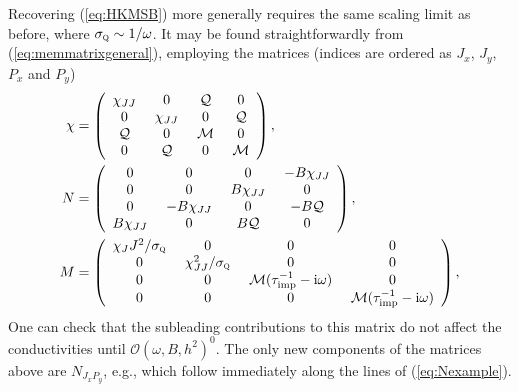 \documentclass[10pt, oneside]{book}
\begin{document}
\begin{doublespace}
Recovering (\ref{eq:HKMSB}) more generally requires the same scaling limit as before, where $\sigma_{\textsc{q}} \sim 1/\omega$.   It may be found straightforwardly from (\ref{eq:memmatrixgeneral}), employing the matrices (indices are ordered as $J_x$, $J_y$, $P_x$ and $P_y$) \begin{subequations}\begin{align}
\chi &= \left(\begin{array}{cccc} \chi_{JJ} &\ 0 &\ \mathcal{Q} &\ 0 \\ 0 &\ \chi_{JJ}  &\ 0 &\ \mathcal{Q} \\ \mathcal{Q} &\ 0 &\ \mathcal{M} &\ 0 \\ 0 &\ \mathcal{Q} &\ 0 &\ \mathcal{M}  \end{array}\right),  \\
N &= \left(\begin{array}{cccc} 0 &\ 0 &\ 0 &\ -B\chi_{JJ} \\ 0 &\ 0  &\ B\chi_{JJ} &\ 0 \\ 0 &\ -B\chi_{JJ} &\ 0 &\ -B\mathcal{Q} \\ B\chi_{JJ} &\ 0 &\ B\mathcal{Q} &\ 0  \end{array}\right),  \\
M &= \left(\begin{array}{cccc} \chi_JJ^2/\sigma_{\textsc{q}} &\ 0 &\ 0 &\ 0 \\ 0 &\ \chi_{JJ}^2/\sigma_{\textsc{q}} &\ 0 &\ 0 \\ 0 &\ 0 &\ \mathcal{M}(\tau_{\mathrm{imp}}^{-1}-\mathrm{i}\omega) &\ 0 \\ 0 &\ 0 &\ 0 &\ \mathcal{M}(\tau_{\mathrm{imp}}^{-1}-\mathrm{i}\omega)  \end{array}\right),
\end{align}\end{subequations}
One can check that the subleading contributions to this matrix do not affect the conductivities until $\mathcal{O}(\omega,B,h^2)^0$.   The only new components of the matrices above are $N_{J_xP_y}$, e.g., which follow immediately along the lines of (\ref{eq:Nexample}).


\end{doublespace}
\end{document}
